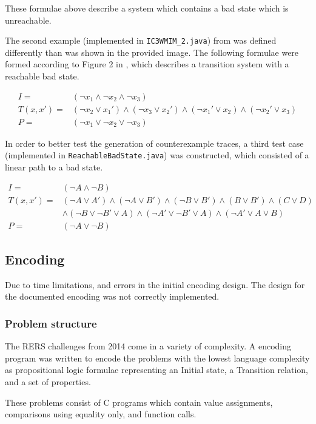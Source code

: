\documentclass[a4paper]{article}
\begin{document}
These formulae above describe a system which contains a bad state which is unreachable.

The second example (implemented in \texttt{IC3WMIM\_2.java}) from \cite{Somenzi2011} was defined differently than was shown in the provided image.
The following formulae were formed according to Figure 2 in \cite{Somenzi2011}, which describes a transition system with a reachable bad state.

\begin{align*}
I =& (\lnot x_1 \land \lnot x_2 \land \lnot x_3)\\
T(x,x') =& (\lnot x_2 \lor x_1') \land (\lnot x_3 \lor x_2') \land (\lnot x_1' \lor x_2) \land (\lnot x_2' \lor x_3)\\
P =& (\lnot x_1 \lor \lnot x_2 \lor \lnot x_3)
\end{align*}

In order to better test the generation of counterexample traces, a third test case (implemented in \texttt{ReachableBadState.java}) was constructed, which consisted of a linear path to a bad state.

\begin{align*}
I =& (\lnot A \land \lnot B)\\
T(x,x') =& (\lnot A \lor A') \land (\lnot A \lor B') \land (\lnot B \lor B') \land (B \lor B') \land (C \lor D)\\
&\land (\lnot B \lor \lnot B' \lor A) \land (\lnot A' \lor \lnot B' \lor A) \land (\lnot A' \lor A \lor B)\\
P =& (\lnot A \lor \lnot B)
\end{align*}

\subsection{Encoding}
Due to time limitations, and errors in the initial encoding design. The design for the documented encoding was not correctly implemented.

\subsubsection{Problem structure}
The RERS challenges from 2014 come in a variety of complexity. A encoding program was written to encode the problems with the lowest language complexity as propositional logic formulae representing an Initial state, a Transition relation, and a set of properties.

These problems consist of C programs which contain value assignments, comparisons using equality only, and function calls.
\end{document}
